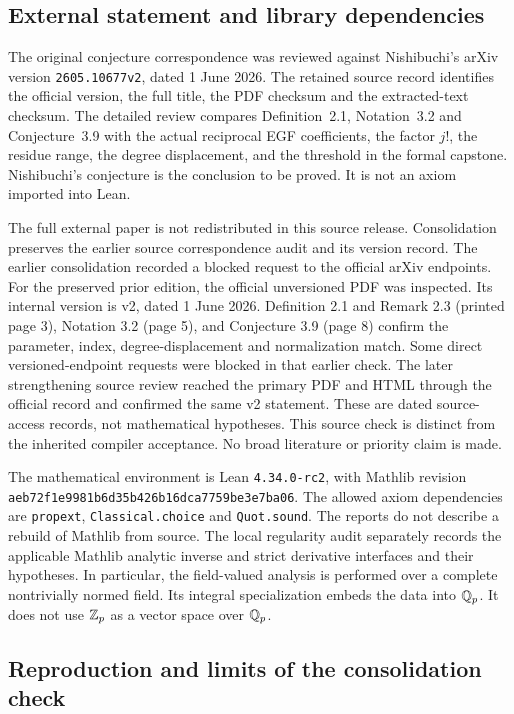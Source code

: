 \subsection{External statement and library dependencies}

The original conjecture correspondence was reviewed against Nishibuchi's
arXiv version \texttt{2605.10677v2}, dated 1 June 2026. The retained source
record identifies the official version, the full title, the PDF checksum and
the extracted-text checksum. The detailed review compares Definition~2.1,
Notation~3.2 and Conjecture~3.9 with the actual reciprocal EGF coefficients,
the factor $j!$, the residue range, the degree displacement, and the threshold
in the formal capstone. Nishibuchi's conjecture is the conclusion to be
proved. It is not an axiom imported into Lean.

The full external paper is not redistributed in this source release.
Consolidation preserves the earlier source correspondence audit and its
version record. The earlier consolidation recorded a blocked request to the official arXiv endpoints.
For the preserved prior edition, the official unversioned PDF was inspected.
Its internal version is v2, dated 1 June 2026. Definition 2.1 and Remark 2.3
(printed page 3), Notation 3.2 (page 5), and Conjecture 3.9 (page 8)
confirm the parameter, index, degree-displacement and normalization match.
Some direct versioned-endpoint requests were blocked in that earlier check. The later strengthening source review reached the primary PDF and HTML through the official record and confirmed the same v2 statement. These are dated source-access records, not mathematical hypotheses.
This source check is distinct from the inherited compiler acceptance.
No broad literature or priority claim is made.

The mathematical environment is Lean \texttt{4.34.0-rc2}, with Mathlib revision
\nolinkurl{aeb72f1e9981b6d35b426b16dca7759be3e7ba06}.
The allowed axiom dependencies are
\texttt{propext}, \texttt{Classical.choice} and \texttt{Quot.sound}.
The reports do not describe a rebuild of Mathlib from source. The local
regularity audit separately records the applicable Mathlib analytic inverse
and strict derivative interfaces and their hypotheses. In particular, the
field-valued analysis is performed over a complete nontrivially normed field.
Its integral specialization embeds the data into $\mathbb Q_p$. It does not use
$\mathbb Z_p$ as a vector space over $\mathbb Q_p$.

\subsection{Reproduction and limits of the consolidation check}

